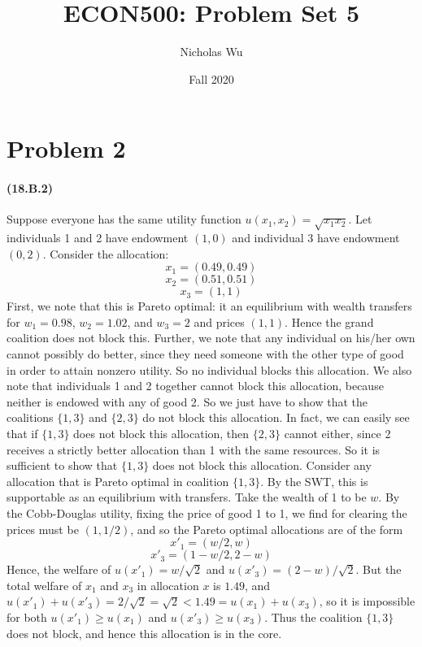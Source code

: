 \documentclass[10pt,letter]{article}
\begin{document}


\title{ECON500: Problem Set 5}

\author{Nicholas Wu}

\date{Fall 2020}

\maketitle


\section*{Problem 2}
\paragraph{(18.B.2)}
Suppose everyone has the same utility function $u(x_1, x_2) = \sqrt{x_1x_2}$. Let individuals 1 and 2 have endowment $(1, 0)$ and individual 3 have endowment $(0, 2)$. Consider the allocation:
\[ x_1 = (0.49, 0.49) \]
\[ x_2 = (0.51, 0.51) \]
\[ x_3 = (1, 1) \]
First, we note that this is Pareto optimal: it an equilibrium with wealth transfers for $w_1 = 0.98$, $w_2 = 1.02$, and $w_3 = 2$ and prices $(1,1)$. Hence the grand coalition does not block this. Further, we note that any individual on his/her own cannot possibly do better, since they need someone with the other type of good in order to attain nonzero utility. So no individual blocks this allocation. We also note that individuals 1 and 2 together cannot block this allocation, because neither is endowed with any of good 2. So we just have to show that the coalitions $\{ 1, 3 \}$ and $\{ 2, 3 \}$ do not block this allocation. In fact, we can easily see that if $\{ 1, 3 \}$ does not block this allocation, then $\{ 2, 3\}$ cannot either, since 2 receives a strictly better allocation than 1 with the same resources. So it is sufficient to show that $\{ 1, 3 \}$ does not block this allocation. Consider any allocation that is Pareto optimal in coalition $\{ 1, 3 \}$.
By the SWT, this is supportable as an equilibrium with transfers. Take the wealth of 1 to be $w$. By the Cobb-Douglas utility, fixing the price of good 1 to 1, we find for clearing the prices must be $(1, 1/2)$, and so the Pareto optimal allocations are of the form
\[ x'_1 = (w/2 , w) \]
\[ x'_3 = (1 - w/2, 2 - w) \]
Hence, the welfare of $u(x'_1) = w / \sqrt{2}$ and $u(x'_3) = (2-w)/\sqrt{2}$. But the total welfare of $x_1$ and $x_3$ in allocation $x$ is $1.49$, and $u(x'_1) + u(x'_3) = 2/\sqrt{2} = \sqrt{2} < 1.49 = u(x_1) + u(x_3)$, so it is impossible for both $u(x'_1) \ge u(x_1)$ and $u(x'_3) \ge u(x_3)$. Thus the coalition $\{ 1, 3 \}$ does not block, and hence this allocation is in the core.
\end{document}
